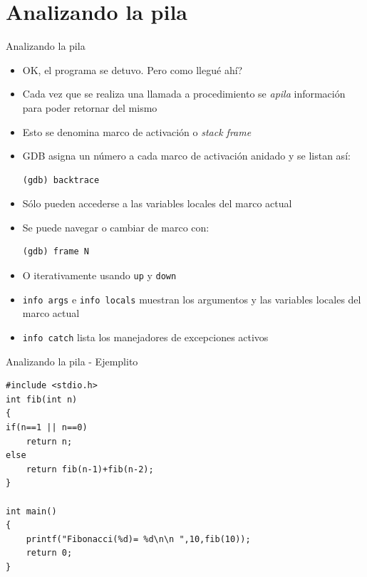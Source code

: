 \documentclass[xetex]{beamer}
\begin{document}
\section{Analizando la pila}

\begin{frame}[fragile]{Analizando la pila}
\begin{itemize}
\item OK, el programa se detuvo. Pero como llegué ahí?
\item Cada vez que se realiza una llamada a procedimiento se {\it apila} información
para poder retornar del mismo
\item Esto se denomina marco de activación o {\it stack frame}
\item GDB asigna un número a cada marco de activación anidado y se listan así:
\begin{verbatim}
(gdb) backtrace
\end{verbatim}
\item Sólo pueden accederse a las variables locales del marco actual
\item Se puede navegar o cambiar de marco con:
\begin{verbatim}
(gdb) frame N
\end{verbatim}
\item O iterativamente usando \verb=up= y \verb=down=
\item \verb=info args= e \verb=info locals= muestran los argumentos y las variables locales del marco actual 
\item \verb=info catch= lista los manejadores de excepciones activos
\end{itemize}
\end{frame}

\begin{frame}[fragile]{Analizando la pila - Ejemplito}
\begin{lstlisting}
#include <stdio.h>
int fib(int n)
{
if(n==1 || n==0)
    return n;
else
    return fib(n-1)+fib(n-2);
}

int main()
{
    printf("Fibonacci(%d)= %d\n\n ",10,fib(10));
    return 0;
}
\end{lstlisting}
\end{frame}
\end{document}
